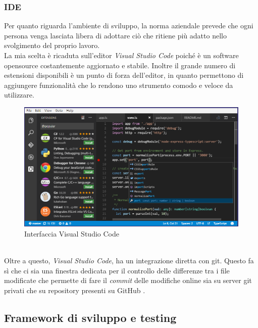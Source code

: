 \subsubsection{IDE}
Per quanto riguarda l'ambiente di sviluppo, la norma aziendale prevede che ogni persona venga lasciata libera di adottare ciò che ritiene più adatto nello svolgimento del proprio lavoro.\\
La mia scelta è ricaduta sull'editor \textit{Visual Studio Code} poiché è un software \gls{opensource} costantemente aggiornato e stabile. Inoltre il grande numero di estensioni disponibili è un punto di forza dell'editor, in quanto permettono di aggiungere funzionalità che lo rendono uno strumento comodo e veloce da utilizzare.
\begin{figure}[h]
	\centering
	\includegraphics[scale=0.5]{immagini/vsc_interface}
	\caption{Interfaccia Visual Studio Code}
\end{figure}
\\
Oltre a questo, \textit{Visual Studio Code}, ha un integrazione diretta con \gls{git}. Questo fa sì che ci sia una finestra dedicata per il controllo delle differenze tra i file modificate che permette di fare il \textit{commit} delle modifiche online sia su server \gls{git} privati che su \gls{repository} presenti su GitHub \cite{gitGuida} \cite{gitSite}.
\subsection{Framework di sviluppo e testing}
